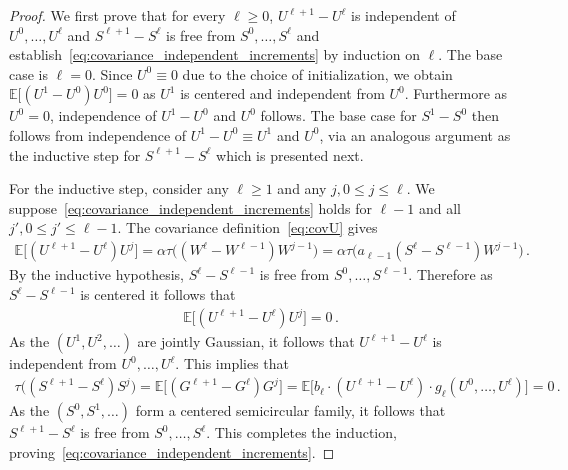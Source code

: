 \documentclass[11pt]{article}
\theoremstyle{definition}
\theoremstyle{remark}
\numberwithin{equation}{section}
\numberwithin{theorem}{section}
\newcommand{\E}{\mathbb E}
\newcommand{\taup}{\tau}
\begin{document}
\begin{proof}
We first prove that for every $\ell\ge 0$, $U^{\ell+1} - U^{\ell}$ is independent of $U^0, \ldots, U^{\ell}$ and $S^{\ell+1} - S^{\ell}$ is free from $S^0, \ldots, S^{\ell}$ and establish~\eqref{eq:covariance_independent_increments} by induction on $\ell$. The base case is $\ell=0$. Since $U^0 \equiv 0$ due to the choice of initialization, we obtain $\E\big[ (U^1- U^0) U^0 \big] = 0$ as $U^1$ is centered and independent from $U^0$. Furthermore as $U^0 = 0$, independence of $U^1 - U^0$ and $U^0$ follows. The base case for $S^1-S^0$ then follows from independence of $U^1-U^0 \equiv U^1$ and $U^0$, via an analogous argument as the inductive step for $S^{\ell+1}-S^\ell$ which is presented next.

For the inductive step, consider any $\ell \ge 1$ and any $j, 0 \le j \le \ell$. We suppose~\eqref{eq:covariance_independent_increments} holds for $\ell-1$ and all $j', 0 \le j' \le \ell-1$. The covariance definition~\eqref{eq:covU} gives 
\begin{align*}
\E\big[ (U^{\ell+1} - U^\ell) U^j \big] = \alpha \taup\big( (W^{\ell} - W^{\ell-1}) W^{j-1}\big) = \alpha \taup\big( a_{\ell-1} (S^\ell - S^{\ell-1}) W^{j-1} \big)\,.
\end{align*}
By the inductive hypothesis, $S^\ell - S^{\ell-1}$ is free from $S^0, \ldots, S^{\ell-1}$. Therefore as $S^\ell - S^{\ell-1}$ is centered it follows that 
\begin{align*}
\E\big[ (U^{\ell+1} - U^\ell) U^j \big] = 0\,.    
\end{align*}
As the $(U^1, U^2, \ldots )$ are jointly Gaussian, it follows that $U^{\ell+1} - U^\ell$ is independent from $U^0, \ldots, U^\ell$. This implies that 
\begin{align*}
\taup\big( (S^{\ell+1} - S^\ell) S^j \big) = \E\big[ (G^{\ell+1} - G^\ell) G^j \big] = \E\big[ b_\ell \cdot (U^{\ell+1} - U^\ell) \cdot g_\ell(U^0, \ldots, U^\ell) \big] = 0\,.
\end{align*}
As the $(S^0, S^1, \ldots)$ form a centered semicircular family, it follows that $S^{\ell+1}-S^\ell$ is free from $S^0, \ldots, S^\ell$. This completes the induction, proving~\eqref{eq:covariance_independent_increments}.


\end{proof}
\end{document}
